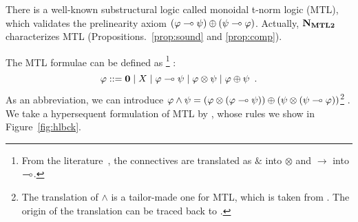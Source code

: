 There is a well-known substructural logic called monoidal t-norm logic
(MTL), which validates the prelinearity axiom
$(\varphi\multimap\psi)\oplus(\psi\multimap\varphi)$.  Actually, $\mathbf{N}_{\mathbf{MTL2}}$ characterizes
MTL (Propositions.~\ref{prop:sound} and \ref{prop:comp}).

The MTL formulae can be defined as%
\footnote{From the literature~\citep{handbook:fuzzy}, the connectives
are translated as $\&$ into $\otimes$ and $\rightarrow$ into $\multimap$.}%
:
\[
 \varphi::= \mathbf{0}\mid X\mid \varphi\multimap\psi \mid \varphi\otimes \psi \mid \varphi \oplus \psi\enspace.
\]
As an abbreviation, we can introduce $\varphi\land\psi =  (\varphi\otimes(\varphi\multimap\psi))\oplus
 (\psi\otimes(\psi\multimap\varphi))$\footnote{
The translation of $\wedge$ is a tailor-made one for MTL,
 which is taken from \citep[p.~48]{handbook:fuzzy}.
 The origin of the translation
can be traced back to \citet[Lemma~6.5]{Cintula200740}.}%
.
We take a hypersequent formulation of MTL by
\citet{baaz2004analytic}, whose rules we show in Figure~\ref{fig:hlbck}.
